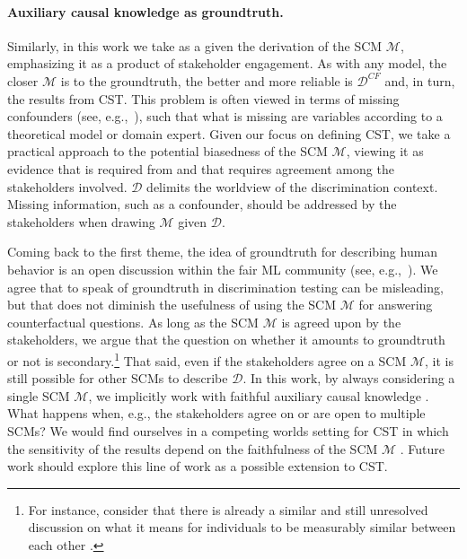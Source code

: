 \paragraph{Auxiliary causal knowledge as groundtruth.}
Similarly, in this work we take as a given the derivation of the SCM $\mathcal{M}$, emphasizing it as a product of stakeholder engagement.
As with any model, the closer $\mathcal{M}$ is to the groundtruth, the better and more reliable is $\mathcal{D}^{CF}$ and, in turn, the results from CST.
This problem is often viewed in terms of missing confounders (see, e.g.,~\textcite{DBLP:conf/uai/KilbertusBKWS19}), such that what is missing are variables according to a theoretical model or domain expert. 
Given our focus on defining CST, we take a practical approach to the potential biasedness of the SCM $\mathcal{M}$, viewing it as evidence that is required from and that requires agreement among the stakeholders involved. 
$\mathcal{D}$ delimits the worldview of the discrimination context. Missing information, such as a confounder, should be addressed by the stakeholders when drawing $\mathcal{M}$ given $\mathcal{D}$.

Coming back to the first theme, the idea of groundtruth for describing human behavior is an open discussion within the fair ML community (see, e.g.,~\textcite{Hu_facct_sex_20, Kasirzadeh2021UseMisuse}). 
We agree that to speak of groundtruth in discrimination testing can be misleading, but that does not diminish the usefulness of using the SCM $\mathcal{M}$ for answering counterfactual questions.
As long as the SCM $\mathcal{M}$ is agreed upon by the stakeholders, we argue that the question on whether it amounts to groundtruth or not is secondary.\footnote{For instance, consider that there is already a similar and still unresolved discussion on what it means for individuals to be measurably similar between each other \parencite{Westen1982EmptyEquality}.}
%
That said, even if the stakeholders agree on a SCM $\mathcal{M}$, it is still possible for other SCMs to describe $\mathcal{D}$.
In this work, by always considering a single SCM $\mathcal{M}$, we implicitly work with faithful auxiliary causal knowledge \parencite{Peters2017_CausalInference}.
%
What happens when, e.g., the stakeholders agree on or are open to multiple SCMs?
%
We would find ourselves in a competing worlds setting for CST in which the sensitivity of the results depend on the faithfulness of the SCM $\mathcal{M}$ \parencite{DBLP:conf/nips/RussellKLS17}.
Future work should explore this line of work as a possible extension to CST.

